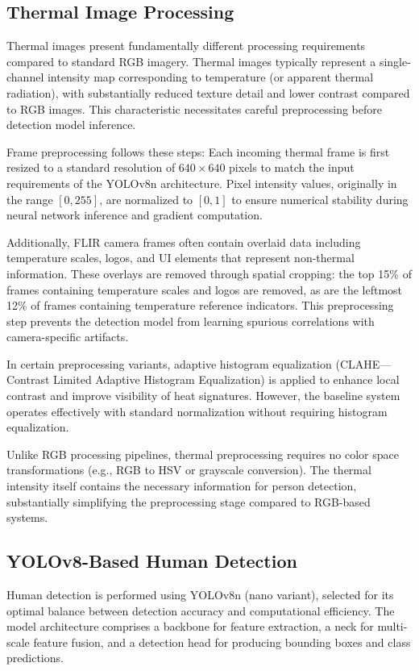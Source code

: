 \documentclass[conference]{IEEEtran}
\begin{document}
\subsection{Thermal Image Processing}

Thermal images present fundamentally different processing requirements compared to standard RGB imagery. Thermal images typically represent a single-channel intensity map corresponding to temperature (or apparent thermal radiation), with substantially reduced texture detail and lower contrast compared to RGB images. This characteristic necessitates careful preprocessing before detection model inference.

Frame preprocessing follows these steps: Each incoming thermal frame is first resized to a standard resolution of $640 \times 640$ pixels to match the input requirements of the YOLOv8n architecture. Pixel intensity values, originally in the range $[0, 255]$, are normalized to $[0, 1]$ to ensure numerical stability during neural network inference and gradient computation.

Additionally, FLIR camera frames often contain overlaid data including temperature scales, logos, and UI elements that represent non-thermal information. These overlays are removed through spatial cropping: the top 15\% of frames containing temperature scales and logos are removed, as are the leftmost 12\% of frames containing temperature reference indicators. This preprocessing step prevents the detection model from learning spurious correlations with camera-specific artifacts.

In certain preprocessing variants, adaptive histogram equalization (CLAHE—Contrast Limited Adaptive Histogram Equalization) is applied to enhance local contrast and improve visibility of heat signatures. However, the baseline system operates effectively with standard normalization without requiring histogram equalization.

Unlike RGB processing pipelines, thermal preprocessing requires no color space transformations (e.g., RGB to HSV or grayscale conversion). The thermal intensity itself contains the necessary information for person detection, substantially simplifying the preprocessing stage compared to RGB-based systems.

\subsection{YOLOv8-Based Human Detection}

Human detection is performed using YOLOv8n (nano variant), selected for its optimal balance between detection accuracy and computational efficiency. The model architecture comprises a backbone for feature extraction, a neck for multi-scale feature fusion, and a detection head for producing bounding boxes and class predictions.
\end{document}
